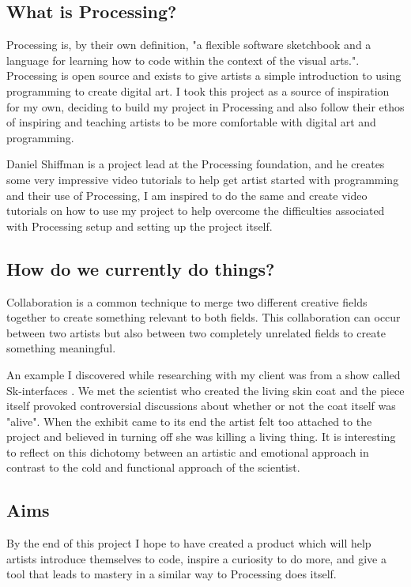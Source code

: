 \documentclass[a4paper]{report}
\begin{document}
\subsection{What is Processing?}
Processing is, by their own definition, "a flexible software sketchbook and a language for learning how to code within the context of the visual arts."\cite{PROCESSING}. Processing is open source and exists to give artists a simple introduction to using programming to create digital art. I took this project as a source of inspiration for my own, deciding to build my project in Processing and also follow their ethos of inspiring and teaching artists to be more comfortable with digital art and programming.

Daniel Shiffman \cite{SHIFFMAN} is a project lead at the Processing foundation, and he creates some very impressive video tutorials to help get artist started with programming and their use of Processing, I am inspired to do the same and create video tutorials on how to use my project to help overcome the difficulties associated with Processing setup and setting up the project itself.

\subsection{How do we currently do things?}
Collaboration is a common technique to merge two different creative fields together to create something relevant to both fields. This collaboration can occur between two artists but also between two completely unrelated fields to create something meaningful. 

An example I discovered while researching with my client was from a show called Sk-interfaces \cite{SKIN}. We met the scientist who created the living skin coat and the piece itself provoked controversial discussions about whether or not the coat itself was "alive". When the exhibit came to its end the artist felt too attached to the project and believed in turning off she was killing a living thing. It is interesting to reflect on this dichotomy between an artistic and emotional approach in contrast to the cold and functional approach of the scientist.

\subsection{Aims}
By the end of this project I hope to have created a product which will help artists introduce themselves to code, inspire a curiosity to do more, and give a tool that leads to mastery in a similar way to Processing\cite{PROCESSING} does itself.
\end{document}
